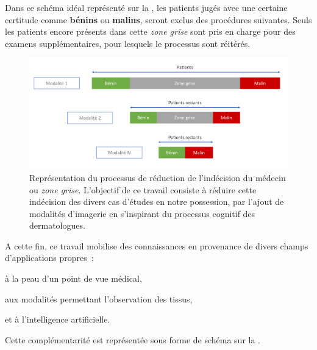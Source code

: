 Dans ce schéma idéal représenté sur la , les patients jugés avec une certaine certitude comme \textbf{bénins} ou \textbf{malins}, seront exclus des procédures suivantes. Seuls les patients encore présents dans cette \textit{zone grise} sont pris en charge pour des examens supplémentaires, pour lesquels le processus sont réitérés.\par 

\begin{figure}[H]
    \centering
    \includegraphics[width=\linewidth]{contents/i_introduction/resources/scheme_reduce_indecision.pdf}
    \caption{Représentation du processus de réduction de l'indécision du médecin ou \textit{zone grise}. L'objectif de ce travail consiste à réduire cette indécision des divers cas d'études en notre possession, par l'ajout de modalités d'imagerie en s'inspirant du processus cognitif des dermatologues.}
    \label{fig:scheme_reduce_indecision}
\end{figure}\par

A cette fin, ce travail mobilise des connaissances en provenance de divers champs d'applications propres~:
\begin{inlinerate}
    \item à la peau d'un point de vue médical, 
    \item aux modalités permettant l'observation des tissus,
    \item et à l'intelligence artificielle.
\end{inlinerate} Cette complémentarité est représentée sous forme de schéma sur la .\par

